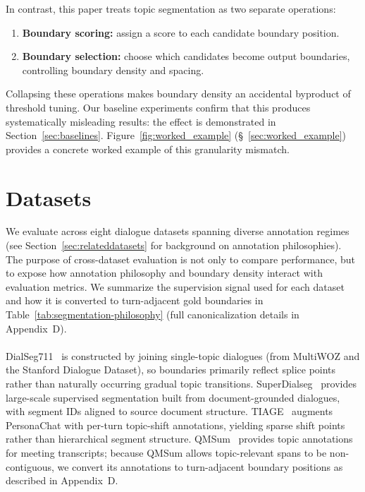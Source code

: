 \documentclass{article}
\makeatletter
\newcommand{\myparagraph}[1]{%
  \paragraph{\@addpunct{#1}}%
}
\makeatother
\begin{document}
In contrast, this paper treats topic segmentation as two separate operations:
\begin{enumerate}
\item \textbf{Boundary scoring:} assign a score to each candidate
  boundary position.
\item \textbf{Boundary selection:} choose which candidates become
  output boundaries, controlling boundary density and spacing.
\end{enumerate}

Collapsing these operations makes boundary density an accidental
byproduct of threshold tuning. Our baseline experiments confirm that
this produces systematically misleading results: the effect is
demonstrated in
Section~\ref{sec:baselines}. Figure~\ref{fig:worked_example}
(\S~\ref{sec:worked_example}) provides a concrete worked example
of this granularity mismatch.

\section{Datasets}
\label{sec:datasets}

We evaluate across eight dialogue datasets spanning diverse annotation
regimes (see Section~\ref{sec:relateddatasets} for background on
annotation philosophies).  The purpose of cross-dataset evaluation is
not only to compare performance, but to expose how annotation
philosophy and boundary density interact with evaluation metrics. We
summarize the supervision signal used for each dataset and how it is
converted to turn-adjacent gold boundaries in
Table~\ref{tab:segmentation-philosophy} (full canonicalization details
in Appendix~D).

\myparagraph{Explicit segmentation annotation}
DialSeg711~\cite{xu2021topicaware} is constructed by joining single-topic
dialogues (from MultiWOZ and the Stanford Dialogue Dataset), so boundaries
primarily reflect splice points rather than naturally occurring gradual
topic transitions.
SuperDialseg~\cite{jiang2023superdialseg} provides large-scale supervised
segmentation built from document-grounded dialogues, with segment IDs aligned
to source document structure.
TIAGE~\cite{xie2021tiage} augments PersonaChat with per-turn topic-shift
annotations, yielding sparse shift points rather than hierarchical segment
structure.
QMSum~\cite{zhong2021qmsum} provides topic annotations for meeting transcripts;
because QMSum allows topic-relevant spans to be non-contiguous, we convert its
annotations to turn-adjacent boundary positions as described in Appendix~D.
\end{document}
